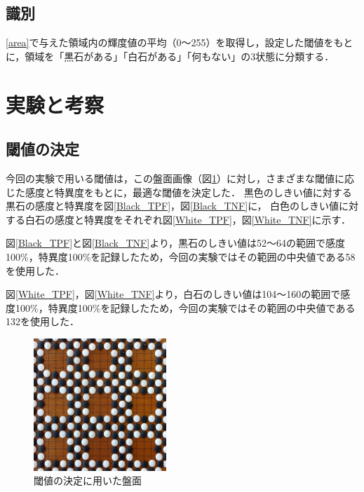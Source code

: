 \documentclass[openright]{nitocs}
\numberwithin{equation}{section}
\begin{document}
        \subsection{識別} \label{identify}  
            \ref{area}で与えた領域内の輝度値の平均（0～255）を取得し，設定した閾値をもとに，領域を「黒石がある」「白石がある」「何もない」の3状態に分類する．            

    \section{実験と考察} %

        \subsection{閾値の決定} \label{threshold}
            今回の実験で用いる閾値は，この盤面画像（図\ref{DSC0087}）に対し，さまざまな閾値に応じた感度と特異度をもとに，最適な閾値を決定した．
            黒色のしきい値に対する黒石の感度と特異度を図\ref{Black_TPF}，図\ref{Black_TNF}に，
            白色のしきい値に対する白石の感度と特異度をそれぞれ図\ref{White_TPF}，図\ref{White_TNF}に示す．

            図\ref{Black_TPF}と図\ref{Black_TNF}より，黒石のしきい値は52～64の範囲で感度100\%，特異度100\%を記録したため，今回の実験ではその範囲の中央値である58を使用した．

            図\ref{White_TPF}，図\ref{White_TNF}より，白石のしきい値は104～160の範囲で感度100\%，特異度100\%を記録したため，今回の実験ではその範囲の中央値である132を使用した．
            \begin{figure} %
                \begin{center}
                \includegraphics[width=50mm,height=50mm]{DSC_0087/boardImg.jpg} 
                \caption{閾値の決定に用いた盤面}
                \label{DSC0087}
                \end{center}
            \end{figure}
\end{document}
